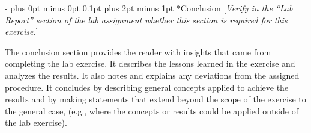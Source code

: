 \documentclass[\FontSize\FontUnit,letterpaper,oneside]{article}
\makeatletter
\renewcommand \section{
    \@startsection{section}{1}{\z@}
      {\dimexpr \FontSize\FontUnit * 2 - \parskip \relax plus 0pt minus 0pt}
      {0.1pt plus 2pt minus 1pt} %
      {\normalfont\normalsize\bfseries}}
\makeatother
\begin{document}
\section*{Conclusion}
[\textit{Verify in the ``Lab Report'' section of the lab assignment
  whether this section is required for this exercise.}]
\par The conclusion section provides the reader with insights that came from
  completing the lab exercise.  It describes the lessons learned in the
  exercise and analyzes the results.  It also notes and explains any
  deviations from the assigned procedure.  It concludes by describing
  general concepts applied to achieve the results and by making
  statements that extend beyond the scope of the exercise to the general
  case, (e.g., where the concepts or results could be applied outside of
  the lab exercise).
\label{LastPage}
\end{document}
